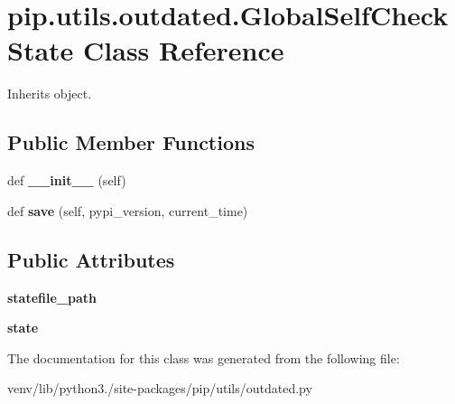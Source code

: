 \hypertarget{classpip_1_1utils_1_1outdated_1_1_global_self_check_state}{}\section{pip.\+utils.\+outdated.\+Global\+Self\+Check\+State Class Reference}
\label{classpip_1_1utils_1_1outdated_1_1_global_self_check_state}


Inherits object.

\subsection*{Public Member Functions}
\begin{DoxyCompactItemize}
\item 
\mbox{\label{classpip_1_1utils_1_1outdated_1_1_global_self_check_state_a8049e5fb939a621117e8ac86aa3a357e}} 
def {\bfseries \+\_\+\+\_\+init\+\_\+\+\_\+} (self)
\item 
\mbox{\label{classpip_1_1utils_1_1outdated_1_1_global_self_check_state_a15e6456679590ef84262bdec8894252b}} 
def {\bfseries save} (self, pypi\+\_\+version, current\+\_\+time)
\end{DoxyCompactItemize}
\subsection*{Public Attributes}
\begin{DoxyCompactItemize}
\item 
\mbox{\label{classpip_1_1utils_1_1outdated_1_1_global_self_check_state_af656b61195a8c63476e4adc816e6eba9}} 
{\bfseries statefile\+\_\+path}
\item 
\mbox{\label{classpip_1_1utils_1_1outdated_1_1_global_self_check_state_a73b063eaede0e5d9c053c89b8d40a10a}} 
{\bfseries state}
\end{DoxyCompactItemize}


The documentation for this class was generated from the following file\+:\begin{DoxyCompactItemize}
\item 
venv/lib/python3./site-\/packages/pip/utils/outdated.\+py\end{DoxyCompactItemize}
